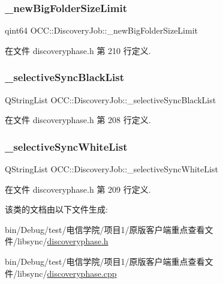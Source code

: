\subsubsection{\texorpdfstring{\+\_\+new\+Big\+Folder\+Size\+Limit}{\_newBigFolderSizeLimit}}
{\footnotesize\ttfamily qint64 O\+C\+C\+::\+Discovery\+Job\+::\+\_\+new\+Big\+Folder\+Size\+Limit}



在文件 discoveryphase.\+h 第 210 行定义.

\mbox{\label{class_o_c_c_1_1_discovery_job_afe69916308e0cb461568408e33283f47}} 
\subsubsection{\texorpdfstring{\+\_\+selective\+Sync\+Black\+List}{\_selectiveSyncBlackList}}
{\footnotesize\ttfamily Q\+String\+List O\+C\+C\+::\+Discovery\+Job\+::\+\_\+selective\+Sync\+Black\+List}



在文件 discoveryphase.\+h 第 208 行定义.

\mbox{\label{class_o_c_c_1_1_discovery_job_af96bb82dc99b68055bb0f985ae10cdcd}} 
\subsubsection{\texorpdfstring{\+\_\+selective\+Sync\+White\+List}{\_selectiveSyncWhiteList}}
{\footnotesize\ttfamily Q\+String\+List O\+C\+C\+::\+Discovery\+Job\+::\+\_\+selective\+Sync\+White\+List}



在文件 discoveryphase.\+h 第 209 行定义.



该类的文档由以下文件生成\+:\begin{DoxyCompactItemize}
\item 
bin/\+Debug/test/电信学院/项目1/原版客户端重点查看文件/libsync/\hyperlink{discoveryphase_8h}{discoveryphase.\+h}\item 
bin/\+Debug/test/电信学院/项目1/原版客户端重点查看文件/libsync/\hyperlink{discoveryphase_8cpp}{discoveryphase.\+cpp}\end{DoxyCompactItemize}

